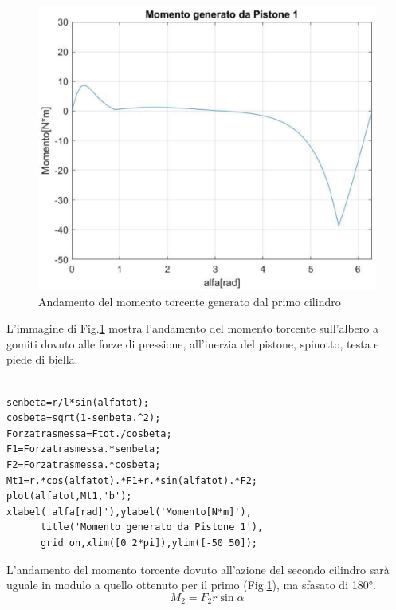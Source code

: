 \begin{figure}[h]
    \centering
    \includegraphics[scale=0.45]{Immagini/GraficoMomento1.png}
    \caption{Andamento del momento torcente generato dal primo cilindro}
    \label{fig:GraficoMomento1}
\end{figure}
\newpage
L’immagine di Fig.\ref{fig:GraficoMomento1} mostra l’andamento del momento torcente sull’albero a gomiti dovuto alle forze di pressione, all’inerzia del pistone, spinotto, testa e piede di biella. 
\begin{lstlisting}[frame=trBL]
%Grafico Momento torcente cilindro 1

senbeta=r/l*sin(alfatot);
cosbeta=sqrt(1-senbeta.^2);
Forzatrasmessa=Ftot./cosbeta;
F1=Forzatrasmessa.*senbeta;
F2=Forzatrasmessa.*cosbeta;
Mt1=r.*cos(alfatot).*F1+r.*sin(alfatot).*F2;
plot(alfatot,Mt1,'b');
xlabel('alfa[rad]'),ylabel('Momento[N*m]'),
      title('Momento generato da Pistone 1'),
      grid on,xlim([0 2*pi]),ylim([-50 50]);
\end{lstlisting}
L’andamento del momento torcente dovuto all’azione del secondo cilindro sarà uguale in modulo a quello ottenuto per il primo (Fig.\ref{fig:GraficoMomento1}), ma sfasato di 180°. 
\begin{equation}
    M_2=F_2r\sin\alpha
\end{equation}
